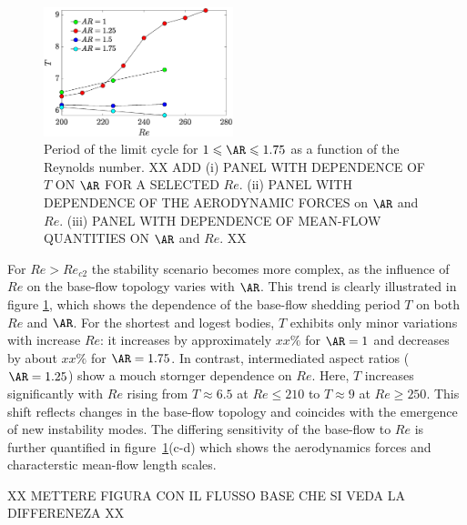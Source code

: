 \begin{figure}
  \centering
  \includegraphics[width=0.49\textwidth]{./fig/AR1s/T_Re.eps}
  \caption{Period of the limit cycle for $1 \le \AR \le 1.75$ as a function of the Reynolds number. XX ADD (i) PANEL WITH DEPENDENCE OF $T$ ON $\AR$ FOR A SELECTED $Re$. (ii) PANEL WITH DEPENDENCE OF THE AERODYNAMIC FORCES on $\AR$ and $Re$. (iii) PANEL WITH DEPENDENCE OF MEAN-FLOW QUANTITIES ON $\AR$ and $Re$. XX}
  \label{fig:T_Re_small}
\end{figure}
%
For $Re>Re_{c2}$ the stability scenario becomes more complex, as the influence of $Re$ on the base-flow topology varies with $\AR$. This trend is clearly illustrated in figure \ref{fig:T_Re_small}, which shows the dependence of the base-flow shedding period $T$ on both $Re$ and $\AR$. For the shortest and logest bodies, $T$ exhibits only minor variations with increase $Re$: it increases by approximately $xx\%$ for $\AR =1$ and decreases by about $xx\%$ for $\AR=1.75$. In contrast, intermediated aspect ratios ($\AR=1.25$) show a mouch stornger dependence on $Re$. Here, $T$ increases significantly with $Re$ rising from $T \approx 6.5$ at $Re \le 210$ to $T \approx 9$ at $Re \ge 250$. This shift reflects changes in the base-flow topology and coincides with the emergence of new instability modes. The differing sensitivity of the base-flow to $Re$ is further quantified in figure~\ref{fig:T_Re_small}(c-d) which shows the aerodynamics forces and characterstic mean-flow length scales.

XX METTERE FIGURA CON IL FLUSSO BASE CHE SI VEDA LA DIFFERENEZA XX


